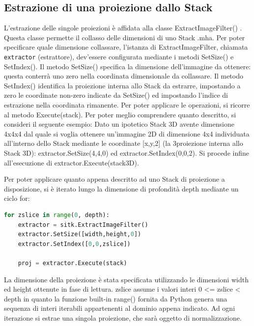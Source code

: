 \documentclass[a4paper,12pt, doubleside]{report}
\begin{document}
            \subsection{Estrazione di una proiezione dallo Stack}
                    L'estrazione delle singole proiezioni è affidata alla classe ExtractImageFilter() \cite{sitk-estractor}. Questa classe permette il collasso delle dimensioni di uno Stack .mha. Per poter specificare quale dimensione collassare, l'istanza di ExtractImageFilter, chiamata \texttt{extractor} (estrattore), dev'essere configurata mediante i metodi SetSize() e 
                    SetIndex(). Il metodo SetSize() specifica la dimensione dell'immagine da ottenere: questa conterrà uno zero nella coordinata dimensionale da collassare. Il metodo SetIndex() identifica la proiezione interna allo Stack da estrarre, impostando a zero le coordinate non-zero indicate da SetSize() ed impostando l'indice di estrazione nella coordinata rimanente. Per poter applicare le operazioni, si ricorre al metodo Execute(stack).
                    Per poter meglio comprendere quanto descritto, si consideri il seguente esempio:
                    Dato un ipotetico Stack 3D avente dimensione 4x4x4 dal quale si voglia ottenere un'immagine 2D di dimensione 4x4 individuata all'interno dello Stack mediante le coordinate [x,y,2] (la 3\degree proiezione interna allo Stack 3D): extractor.SetSize(4,4,0) ed extractor.SetIndex(0,0,2). Si procede infine all'esecuzione di extractor.Execute(stack\textunderscore 3D).
                    
                \par
                    Per poter applicare quanto appena descritto ad uno Stack di proiezione a disposizione, si è iterato lungo la dimensione di profondità depth mediante un ciclo for:
                    
                    \begin{lstlisting}[language=python, frame=bt]
for zslice in range(0, depth):
    extractor = sitk.ExtractImageFilter()
    extractor.SetSize([width,height,0])
    extractor.SetIndex([0,0,zslice])

    proj = extractor.Execute(stack)
                    \end{lstlisting} 
                    
                    La dimensione della proiezione è stata specificata utilizzando le dimensioni width ed height ottenute in fase di lettura.
                    zslice assume i valori interi 0 <= zslice < depth in quanto la funzione built-in range()\cite{python-range} fornita da Python genera una sequenza di interi iterabili appartenenti al dominio appena indicato.
                    Ad ogni iterazione si estrae una singola proiezione, che sarà oggetto di normalizzazione.
                
\end{document}
